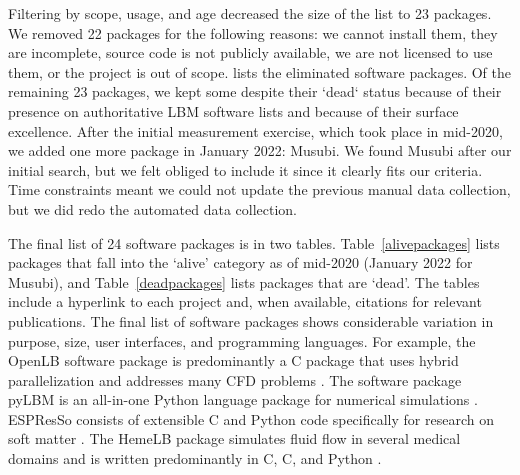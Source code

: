 \documentclass[final, 3p, times, authoryear]{elsarticle}
\newcommand{\CC}{C\nolinebreak\hspace{-.05em}\raisebox{.4ex}{\small\bf
+}\nolinebreak\hspace{-.10em}\raisebox{.4ex}{\small\bf +}}
\begin{document}
Filtering by scope, usage, and age decreased the size of the list to 23
packages. We removed 22 packages for the following reasons: we cannot install
them, they are incomplete, source code is not publicly available, we are not
licensed to use them, or the project is out of scope. \citet{Michalski2021}
lists the eliminated software packages. Of the remaining 23 packages, we kept
some despite their `dead` status because of their presence on authoritative LBM
software lists and because of their surface excellence. After the initial
measurement exercise, which took place in mid-2020, we added one more package in
January 2022: Musubi. We found Musubi after our initial search, but we felt
obliged to include it since it clearly fits our criteria. Time constraints meant
we could not update the previous manual data collection, but we did redo the
automated data collection.

The final list of 24 software packages is in two tables.
Table~\ref{alivepackages} lists packages that fall into the `alive' category as
of mid-2020 (January 2022 for Musubi), and Table~\ref{deadpackages} lists
packages that are `dead'. The tables include a hyperlink to each project and,
when available, citations for relevant publications.  The final list of software
packages shows considerable variation in purpose, size, user interfaces, and
programming languages. For example, the OpenLB software package is predominantly
a \CC{} package that uses hybrid parallelization and addresses many CFD problems
\citep{heuveline2009towards}. The software package pyLBM is an all-in-one Python
language package for numerical simulations \citep{graille2017pylbm}. ESPResSo
consists of extensible \CC{} and Python code specifically for research on soft
matter \citep{weik2019espresso}. The HemeLB package simulates fluid flow in
several medical domains and is written predominantly in C, \CC, and Python
\citep{mazzeo2008hemelb}.
\end{document}
